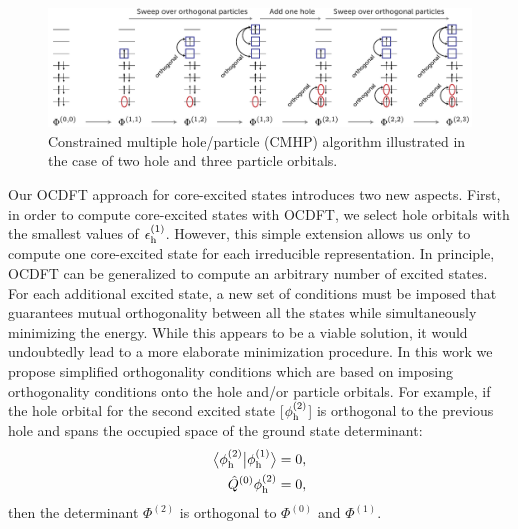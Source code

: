\documentclass[12pt]{article}
\newcommand{\braket}[3][0]
{\ifthenelse{\equal{#1}{0}}{\left\langle #2 \middle| #3 \right\rangle}
{\ifthenelse{\equal{#1}{1}}{\big\langle #2 \big| #3 \big\rangle}
{\ifthenelse{\equal{#1}{2}}{\Big\langle #2 \Big| #3 \Big\rangle}
{\ifthenelse{\equal{#1}{3}}{\bigg\langle #2 \bigg| #3 \bigg\rangle}
{\ifthenelse{\equal{#1}{4}}{\Bigg\langle #2 \Bigg| #3 \Bigg\rangle}
{Error}}}}}
}
\begin{document}
\begin{figure}
\centering
\includegraphics[width=18cm]{Figure2NEW.pdf}
\caption{Constrained multiple hole/particle (CMHP) algorithm illustrated in the case of two hole and three particle orbitals.}
\label{fig:CMHP}
\end{figure}
Our OCDFT approach for core-excited states introduces two new aspects.
First, in order to compute core-excited states with OCDFT, we select hole orbitals with the smallest values of $\epsilon^{(1)}_{\rm h}$.
However, this simple extension allows us only to compute one core-excited state for each irreducible representation.
In principle, OCDFT can be generalized to compute an arbitrary number of excited states.  For each additional excited state, a new set of conditions must be imposed that guarantees mutual orthogonality  between all the states while simultaneously minimizing the energy.
While this appears to be a viable solution, it would undoubtedly lead to a more elaborate minimization procedure.
In this work we propose simplified orthogonality conditions which are based on imposing orthogonality conditions onto the hole and/or particle orbitals.
For example, if the hole orbital for the second excited state [$\phi_{\rm h}^{(2)}$] is orthogonal to the previous hole and spans the occupied space of the ground state determinant:
\begin{align}
\braket[1]{\phi_{\rm h}^{(2)}}{\phi_{\rm h}^{(1)}} = 0,\\
\hat{Q}^{(0)}\phi_{\rm h}^{(2)} = 0,
\end{align}
then the determinant $\Phi^{(2)}$ is orthogonal to $\Phi^{(0)}$ and $\Phi^{(1)}$.
\end{document}
